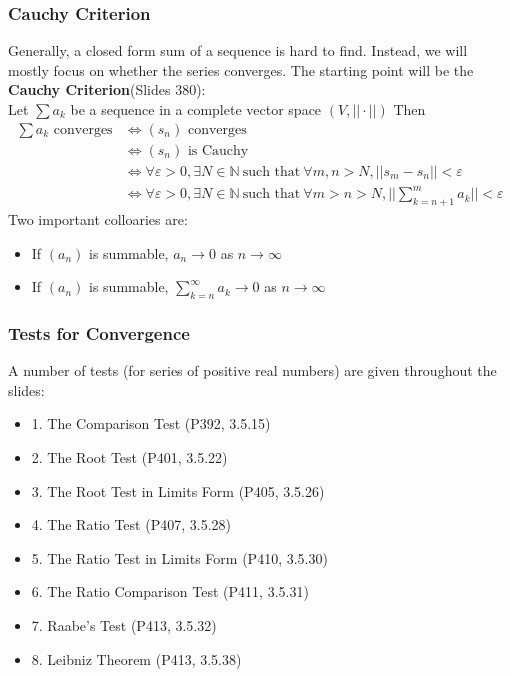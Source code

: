 \documentclass{beamer}
\begin{document}
\begin{frame}
    \frametitle{Cauchy Criterion}
    \hspace{1em}
    Generally, a closed form sum of a sequence is hard to find. Instead, we
    will mostly focus on whether the series converges.
    The starting point will be the \textbf{Cauchy Criterion}(Slides 380):\\
    \hspace{1em}Let $\sum a_k$ be a sequence in a complete vector space $(V, ||\cdot||)$ Then
    \begin{align*}
        \sum a_k \text{ converges}
         & \Leftrightarrow (s_n ) \text{ converges}                                                                                              \\
         & \Leftrightarrow (s_n) \text{ is Cauchy}                                                                                               \\
         & \Leftrightarrow \forall \varepsilon>0, \exists N \in \mathbb{N} ~\text{such that}~ \forall m,n>N, ||s_m-s_n ||<\varepsilon            \\
         & \Leftrightarrow \forall \varepsilon>0, \exists N \in \mathbb{N}~ \text{such that}~ \forall m>n>N, ||\sum_{k=n+1}^m a_k ||<\varepsilon
    \end{align*}
    Two important colloaries are:
    \begin{itemize}
        \item  If $(a_n)$ is summable, $a_n\to 0$ as $n\to \infty$
        \item  If $(a_n)$ is summable, $\sum_{k=n}^\infty a_k\to 0$ as $n \to \infty$
    \end{itemize}
\end{frame}




\begin{frame}
    \frametitle{Tests for Convergence}
    \hspace{1em}
    A number of tests (for series of positive real numbers) are given
    throughout the slides:
    \begin{itemize}
        \item 1. The Comparison Test (P392, 3.5.15)
        \item 2. The Root Test (P401, 3.5.22)
        \item 3. The Root Test in Limits Form (P405, 3.5.26)
        \item 4. The Ratio Test (P407, 3.5.28)
        \item 5. The Ratio Test in Limits Form (P410, 3.5.30)
        \item 6. The Ratio Comparison Test (P411, 3.5.31)
        \item 7. Raabe’s Test (P413, 3.5.32)
        \item 8. Leibniz Theorem (P413, 3.5.38)
    \end{itemize}
\end{frame}
\end{document}
